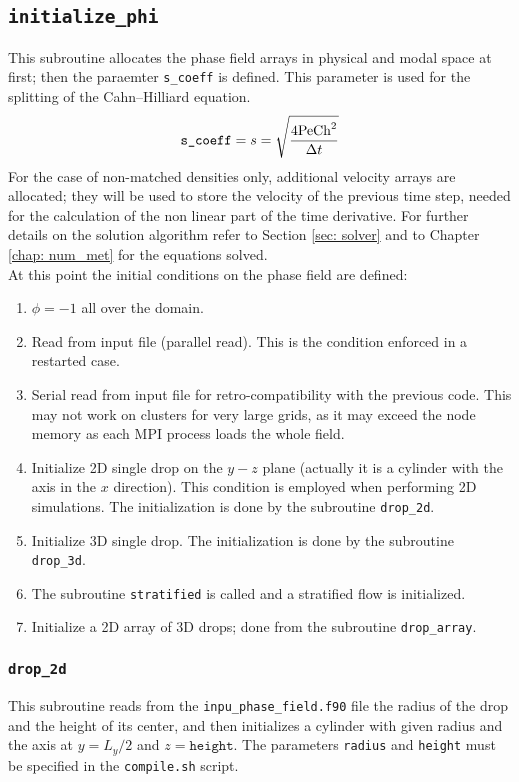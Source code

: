 \subsection{\texttt{initialize\_phi}}
This subroutine allocates the phase field arrays in physical and modal space at first; then the paraemter \texttt{s\_coeff} is defined. This parameter is used for the splitting of the Cahn--Hilliard equation.
\[
\texttt{s\_coeff}=s=\sqrt{\frac{4\textnormal{Pe}\textnormal{Ch}^2}{\Delta t}}
\]
For the case of non-matched densities only, additional velocity arrays are allocated; they will be used to store the velocity of the previous time step, needed for the calculation of the non linear part of the time derivative. For further details on the solution algorithm refer to Section \ref{sec: solver} and to Chapter \ref{chap: num_met} for the equations solved.\\
At this point the initial conditions on the phase field are defined:
\begin{enumerate}
\item $\phi=-1$ all over the domain.
\item Read from input file (parallel read). This is the condition enforced in a restarted case.
\item Serial read from input file for retro-compatibility with the previous code. This may not work on clusters for very large grids, as it may exceed the node memory as each MPI process loads the whole field.
\item Initialize 2D single drop  on the $y-z$ plane (actually it is a cylinder with the axis in the $x$ direction). This condition is employed when performing 2D simulations. The initialization is done by the subroutine \texttt{drop\_2d}.
\item Initialize 3D single drop. The initialization is done by the subroutine \texttt{drop\_3d}.
\item The subroutine \texttt{stratified} is called and a stratified flow is initialized.
\item Initialize a 2D array of 3D drops; done from the subroutine \texttt{drop\_array}.
\end{enumerate}

\subsubsection{\texttt{drop\_2d}}
This subroutine reads from the \texttt{inpu\_phase\_field.f90} file the radius of the drop and the height of its center, and then initializes a cylinder with given radius and the axis at $y=L_y/2$ and $z=\texttt{height}$. The parameters \texttt{radius} and \texttt{height} must be specified in the \texttt{compile.sh} script.

